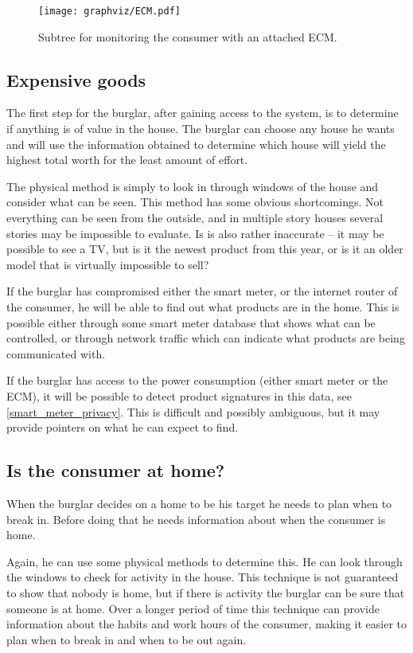 \begin{figure}[H]
\center
\texttt{[image: graphviz/ECM.pdf]}
\caption{Subtree for monitoring the consumer with an attached ECM.}
\label{attacktree:ECM}
\end{figure}


\subsection{Expensive goods}
The first step for the burglar, after gaining access to the system, is to determine if anything is of value in the house. 
The burglar can choose any house he wants and will use the information obtained to determine which house will yield the highest total worth for the least amount of effort.

The physical method is simply to look in through windows of the house and consider what can be seen. 
This method has some obvious shortcomings.
Not everything can be seen from the outside, and in multiple story houses several stories may be impossible to evaluate.
Is is also rather inaccurate -- it may be possible to see a TV, but is it the newest product from this year, or is it an older model that is virtually impossible to sell?

If the burglar has compromised either the smart meter, or the internet router of the consumer, he will be able to find out what products are in the home. 
This is possible either through some smart meter database that shows what can be controlled, or through network traffic which can indicate what products are being communicated with.

If the burglar has access to the power consumption (either smart meter or the ECM), it will be possible to detect product signatures in this data, see \cref{smart_meter_privacy}.
This is difficult and possibly ambiguous, but it may provide pointers on what he can expect to find.

\subsection{Is the consumer at home?}
When the burglar decides on a home to be his target he needs to plan when to break in.
Before doing that he needs information about when the consumer is home.

Again, he can use some physical methods to determine this.
He can look through the windows to check for activity in the house.
This technique is not guaranteed to show that nobody is home, but if there is activity the burglar can be sure that someone is at home.
Over a longer period of time this technique can provide information about the habits and work hours of the consumer, making it easier to plan when to break in and when to be out again.

